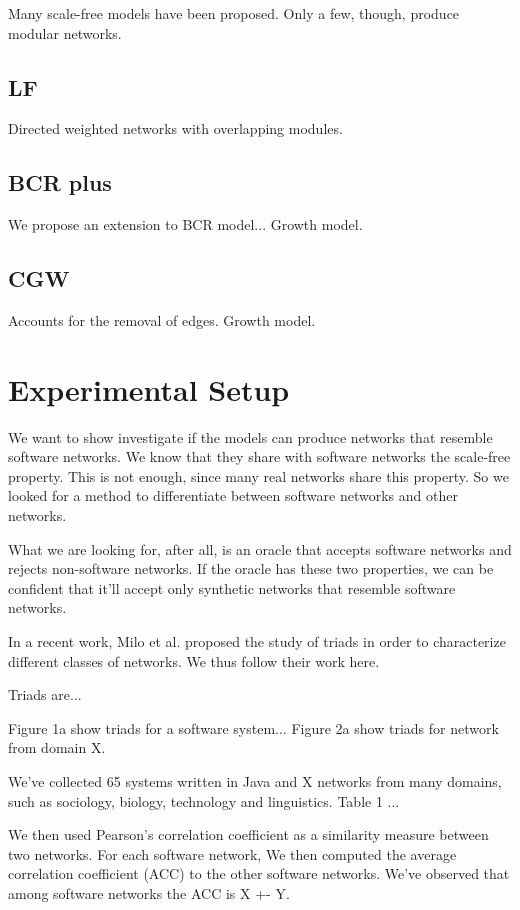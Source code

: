 Many scale-free models have been proposed. Only a few, though, produce modular
networks. 

\subsection{LF}

Directed weighted networks with overlapping modules.

\subsection{BCR plus}

We propose an extension to BCR model... Growth model.

\subsection{CGW}

Accounts for the removal of edges. Growth model.

\section{Experimental Setup}

We want to show investigate if the models can produce networks that resemble
software networks. We know that they share with software networks the scale-free
property. This is not enough, since many real networks share this property. So
we looked for a method to differentiate between software networks and other
networks.

What we are looking for, after all, is an oracle that accepts software networks
and rejects non-software networks. If the oracle has these two properties, we
can be confident that it'll accept only synthetic networks that resemble
software networks.

In a recent work, Milo et al. proposed the study of triads in order to
characterize different classes of networks. We thus follow their work here.

Triads are...

Figure 1a show triads for a software system... Figure 2a show triads for network
from domain X.

We've collected 65 systems written in Java and X networks from many domains,
such as sociology, biology, technology and linguistics.
Table 1 ...

We then used Pearson's correlation coefficient as a similarity measure between
two networks. For each software network, We then computed the average
correlation coefficient (ACC) to the other software networks. We've observed
that among software networks the ACC is X +- Y.

